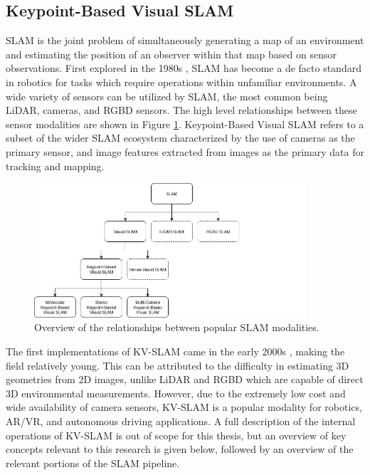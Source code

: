 \subsection{Keypoint-Based Visual SLAM}
\label{sec:kv_slam_background}

SLAM is the joint problem of simultaneously generating a map of an environment and estimating the position of an observer within that map based on sensor observations. First explored in the 1980s \cite{smithEstimatingUncertainSpatial1988}, SLAM has become a de facto standard in robotics for tasks which require operations within unfamiliar environments. A wide variety of sensors can be utilized by SLAM, the most common being LiDAR, cameras, and RGBD sensors. The high level relationships between these sensor modalities are shown in Figure \ref{fig:slam_family_tree}. Keypoint-Based Visual SLAM refers to a subset of the wider SLAM ecosystem characterized by the use of cameras as the primary sensor, and image features extracted from images as the primary data for tracking and mapping.

\begin{figure}[!ht]
    \centering
    \includegraphics[width=0.9\textwidth]{resources/slam_family_tree.png}
    \caption[SLAM Family Tree]{Overview of the relationships between popular SLAM modalities.}
    \label{fig:slam_family_tree}
\end{figure}

The first implementations of KV-SLAM came in the early 2000s \cite{seMobileRobotLocalization2002}\cite{davisonRealtimeSimultaneousLocalisation2003}, making the field relatively young. This can be attributed to the difficulty in estimating 3D geometries from 2D images, unlike LiDAR and RGBD which are capable of direct 3D environmental measurements. However, due to the extremely low cost and wide availability of camera sensors, KV-SLAM is a popular modality for robotics, AR/VR, and autonomous driving applications. A full description of the internal operations of KV-SLAM is out of scope for this thesis, but an overview of key concepts relevant to this research is given below, followed by an overview of the relevant portions of the SLAM pipeline.

